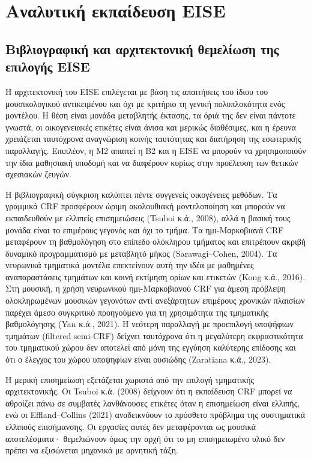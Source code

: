\documentclass[11pt,a4paper]{article}
\begin{document}
\section{Αναλυτική εκπαίδευση EISE}\label{app:eise}

\subsection{Βιβλιογραφική και αρχιτεκτονική θεμελίωση της επιλογής EISE}\label{app:eise-rationale}

Η αρχιτεκτονική του EISE επιλέγεται με βάση τις απαιτήσεις του ίδιου του μουσικολογικού αντικειμένου και όχι με κριτήριο τη γενική πολυπλοκότητα ενός μοντέλου. Η θέση είναι μονάδα μεταβλητής έκτασης, τα όριά της δεν είναι πάντοτε γνωστά, οι οικογενειακές ετικέτες είναι άνισα και μερικώς διαθέσιμες, και η έρευνα χρειάζεται ταυτόχρονα αναγνώριση κοινής ταυτότητας και διατήρηση της εσωτερικής παραλλαγής. Επιπλέον, η M2 απαιτεί η B2 και η EISE να μπορούν να χρησιμοποιούν την ίδια μαθησιακή υποδομή και να διαφέρουν κυρίως στην προέλευση των θετικών σχεσιακών ζευγών.

Η βιβλιογραφική σύγκριση καλύπτει πέντε συγγενείς οικογένειες μεθόδων. Τα γραμμικά CRF προσφέρουν ώριμη ακολουθιακή μοντελοποίηση και μπορούν να εκπαιδευθούν με ελλιπείς επισημειώσεις (Tsuboi κ.ά., 2008), αλλά η βασική τους μονάδα είναι το επιμέρους γεγονός και όχι το τμήμα. Τα ημι-Μαρκοβιανά CRF μεταφέρουν τη βαθμολόγηση στο επίπεδο ολόκληρου τμήματος και επιτρέπουν ακριβή δυναμικό προγραμματισμό με μεταβλητό μήκος (Sarawagi--Cohen, 2004). Τα νευρωνικά τμηματικά μοντέλα επεκτείνουν αυτή την ιδέα με μαθημένες αναπαραστάσεις τμημάτων και κοινή εκτίμηση ορίων και ετικετών (Kong κ.ά., 2016). Στη μουσική, η χρήση νευρωνικού ημι-Μαρκοβιανού CRF για άμεση πρόβλεψη ολοκληρωμένων μουσικών γεγονότων αντί ανεξάρτητων επιμέρους χρονικών πλαισίων παρέχει άμεσο συγκριτικό προηγούμενο για τη χρησιμότητα της τμηματικής βαθμολόγησης (Yan κ.ά., 2021). Η νεότερη παραλλαγή με προεπιλογή υποψήφιων τμημάτων (filtered semi-CRF) δείχνει ταυτόχρονα ότι η μεγαλύτερη εκφραστικότητα του τμηματικού χώρου δεν αποτελεί από μόνη της εγγύηση καλύτερης επίδοσης και ότι ο έλεγχος του χώρου υποψηφίων είναι ουσιώδης (Zaratiana κ.ά., 2023).

Η μερική επισημείωση εξετάζεται χωριστά από την επιλογή τμηματικής αρχιτεκτονικής. Οι Tsuboi κ.ά. (2008) δείχνουν ότι η εκπαίδευση CRF μπορεί να αθροίζει πάνω σε συμβατές λανθάνουσες ετικέτες όταν η επισημείωση είναι ελλιπής, ενώ οι Effland--Collins (2021) αναδεικνύουν το πρόσθετο πρόβλημα της συστηματικά ελλιπούς επισήμανσης. Οι εργασίες αυτές δεν μεταφέρονται ως μουσικά αποτελέσματα· θεμελιώνουν όμως την αρχή ότι το μη επισημειωμένο υλικό δεν πρέπει να εξισώνεται μηχανικά με αρνητική τάξη.
\end{document}
